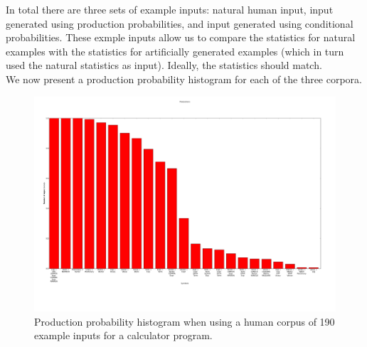 In total there are three sets of example inputs: natural human input, input
generated using production probabilities, and input generated using conditional
probabilities. These exmple inputs allow us to compare the statistics for
natural examples with the statistics for artificially generated examples (which
in turn used the natural statistics as input). Ideally, the statistics should
match. \\

\noindent We now present a production probability histogram for each of the
three corpora. \\

\begin{figure}
    \begin{center}

\includegraphics[scale=0.23]{figs/human/production_probability_histogram.png}
    \end{center}
        \caption{Production probability histogram when using a human corpus of
190 example inputs for a calculator program.}
    \label{times}
\end{figure}

